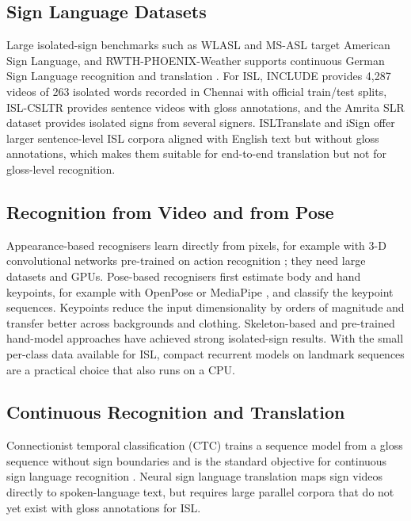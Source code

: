 \documentclass[conference]{IEEEtran}
\begin{document}
\subsection{Sign Language Datasets}
Large isolated-sign benchmarks such as WLASL \cite{li2020wlasl} and MS-ASL \cite{joze2019msasl} target American Sign Language, and RWTH-PHOENIX-Weather \cite{koller2015continuous} supports continuous German Sign Language recognition and translation \cite{camgoz2018neural}. For ISL, INCLUDE \cite{sridhar2020include} provides 4{,}287 videos of 263 isolated words recorded in Chennai with official train/test splits, ISL-CSLTR \cite{elakkiya2021csltr} provides sentence videos with gloss annotations, and the Amrita SLR dataset \cite{amrita2023} provides isolated signs from several signers. ISLTranslate \cite{joshi2023isltranslate} and iSign \cite{joshi2024isign} offer larger sentence-level ISL corpora aligned with English text but without gloss annotations, which makes them suitable for end-to-end translation but not for gloss-level recognition.

\subsection{Recognition from Video and from Pose}
Appearance-based recognisers learn directly from pixels, for example with 3-D convolutional networks pre-trained on action recognition \cite{carreira2017quo}; they need large datasets and GPUs. Pose-based recognisers first estimate body and hand keypoints, for example with OpenPose \cite{cao2019openpose} or MediaPipe \cite{lugaresi2019mediapipe,zhang2020mediapipehands}, and classify the keypoint sequences. Keypoints reduce the input dimensionality by orders of magnitude and transfer better across backgrounds and clothing. Skeleton-based and pre-trained hand-model approaches \cite{jiang2021skeleton,hu2021signbert} have achieved strong isolated-sign results. With the small per-class data available for ISL, compact recurrent models \cite{cho2014gru,schuster1997bidirectional} on landmark sequences are a practical choice that also runs on a CPU.

\subsection{Continuous Recognition and Translation}
Connectionist temporal classification (CTC) \cite{graves2006ctc} trains a sequence model from a gloss sequence without sign boundaries and is the standard objective for continuous sign language recognition \cite{koller2015continuous}. Neural sign language translation \cite{camgoz2018neural} maps sign videos directly to spoken-language text, but requires large parallel corpora that do not yet exist with gloss annotations for ISL.
\end{document}
